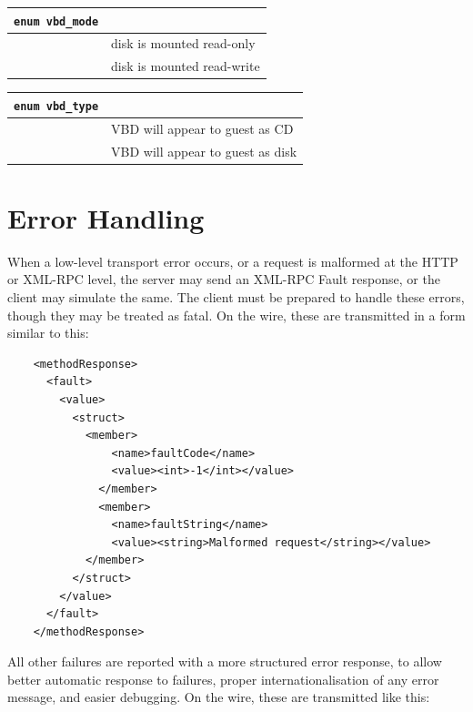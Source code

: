 \vspace{1cm}
\begin{longtable}{|ll|}
\hline
{\tt enum vbd\_mode} & \\
\hline
\hspace{0.5cm}{\tt RO} & disk is mounted read-only \\
\hspace{0.5cm}{\tt RW} & disk is mounted read-write \\
\hline
\end{longtable}

\vspace{1cm}
\begin{longtable}{|ll|}
\hline
{\tt enum vbd\_type} & \\
\hline
\hspace{0.5cm}{\tt CD} & VBD will appear to guest as CD \\
\hspace{0.5cm}{\tt Disk} & VBD will appear to guest as disk \\
\hline
\end{longtable}

\vspace{1cm}
\newpage

\section{Error Handling}
When a low-level transport error occurs, or a request is malformed at the HTTP
or XML-RPC level, the server may send an XML-RPC Fault response, or the client
may simulate the same.  The client must be prepared to handle these errors,
though they may be treated as fatal.  On the wire, these are transmitted in a
form similar to this:

\begin{verbatim}
    <methodResponse>
      <fault>
        <value>
          <struct>
            <member>
                <name>faultCode</name>
                <value><int>-1</int></value>
              </member>
              <member>
                <name>faultString</name>
                <value><string>Malformed request</string></value>
            </member>
          </struct>
        </value>
      </fault>
    </methodResponse>
\end{verbatim}

All other failures are reported with a more structured error response, to
allow better automatic response to failures, proper internationalisation of
any error message, and easier debugging.  On the wire, these are transmitted
like this:

